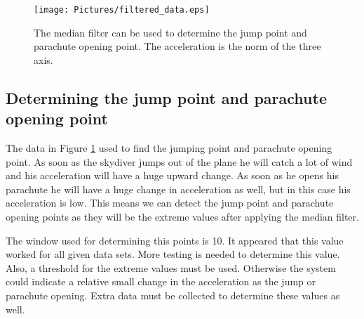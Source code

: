 \begin{figure}
  \centering
  \texttt{[image: Pictures/filtered\_data.eps]}
  \caption{The median filter can be used to determine the jump point and parachute opening point. The acceleration is the norm of the three axis.}
  \label{fig:filtered_data}
\end{figure}

\subsection{Determining the jump point and parachute opening point}
The data in Figure \ref{fig:filtered_data} used to find the jumping point and parachute opening point. As soon as the skydiver jumps out of the plane he will catch a lot of wind and his acceleration will have a huge upward change. As soon as he opens his parachute he will have a huge change in acceleration as well, but in this case his acceleration is low. This means we can detect the jump point and parachute opening points as they will be the extreme values after applying the median filter.

The window used for determining this points is 10. It appeared that this value worked for all given data sets. More testing is needed to determine this value. Also, a threshold for the extreme values must be used. Otherwise the system could indicate a relative small change in the acceleration as the jump or parachute opening. Extra data must be collected to determine these values as well.